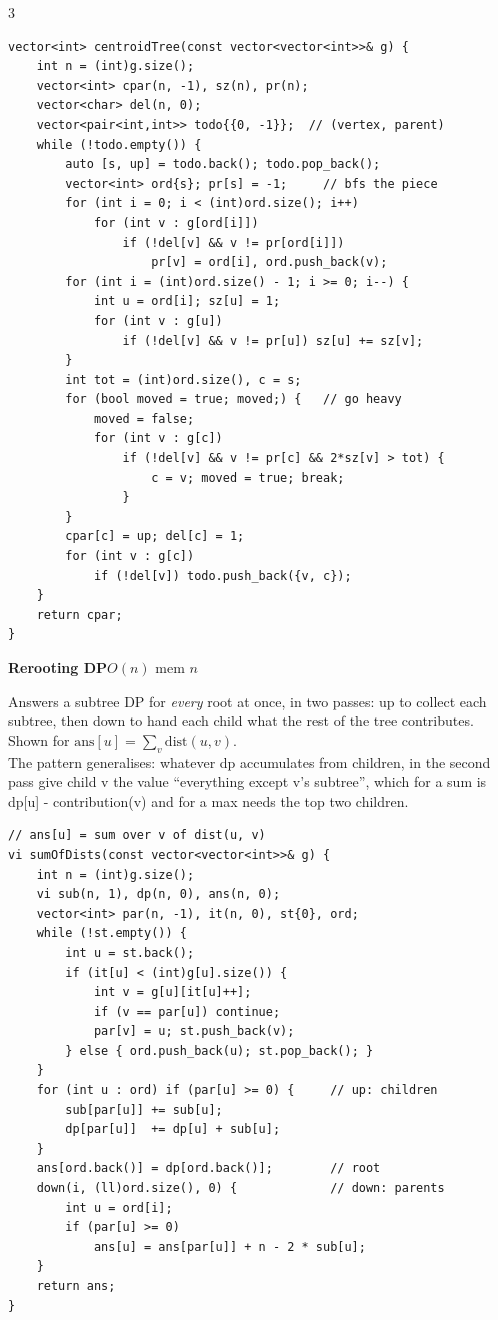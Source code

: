 \documentclass[9pt,a4paper]{extarticle}
\newcommand{\entry}[3]{%
  \addcontentsline{toc}{subsection}{#1}%
  \vspace{0.8ex}%
  \noindent\colorbox{hdbg}{\parbox{\dimexpr\columnwidth-2\fboxsep}{%
    \strut\textbf{#1}\hfill{\footnotesize\textsf{#2}}}}\par
  \vspace{0.4ex}%
  {\footnotesize #3\par}%
}
\newcommand{\code}[1]{{\ttfamily\small #1}}
\begin{document}
\begin{multicols*}{3}
\begin{lstlisting}
vector<int> centroidTree(const vector<vector<int>>& g) {
    int n = (int)g.size();
    vector<int> cpar(n, -1), sz(n), pr(n);
    vector<char> del(n, 0);
    vector<pair<int,int>> todo{{0, -1}};  // (vertex, parent)
    while (!todo.empty()) {
        auto [s, up] = todo.back(); todo.pop_back();
        vector<int> ord{s}; pr[s] = -1;     // bfs the piece
        for (int i = 0; i < (int)ord.size(); i++)
            for (int v : g[ord[i]])
                if (!del[v] && v != pr[ord[i]])
                    pr[v] = ord[i], ord.push_back(v);
        for (int i = (int)ord.size() - 1; i >= 0; i--) {
            int u = ord[i]; sz[u] = 1;
            for (int v : g[u])
                if (!del[v] && v != pr[u]) sz[u] += sz[v];
        }
        int tot = (int)ord.size(), c = s;
        for (bool moved = true; moved;) {   // go heavy
            moved = false;
            for (int v : g[c])
                if (!del[v] && v != pr[c] && 2*sz[v] > tot) {
                    c = v; moved = true; break;
                }
        }
        cpar[c] = up; del[c] = 1;
        for (int v : g[c])
            if (!del[v]) todo.push_back({v, c});
    }
    return cpar;
}
\end{lstlisting}

\entry{Rerooting DP}{$O(n)$ \quad mem $n$}{%
Answers a subtree DP for \emph{every} root at once, in two passes: up to collect each
subtree, then down to hand each child what the rest of the tree contributes. Shown for
$\mathrm{ans}[u] = \sum_v \mathrm{dist}(u,v)$.\\[0.3ex]
The pattern generalises: whatever \code{dp} accumulates from children, in the second
pass give child \code{v} the value ``everything except \code{v}'s subtree'', which for
a sum is \code{dp[u] - contribution(v)} and for a max needs the top two children.}

\begin{lstlisting}
// ans[u] = sum over v of dist(u, v)
vi sumOfDists(const vector<vector<int>>& g) {
    int n = (int)g.size();
    vi sub(n, 1), dp(n, 0), ans(n, 0);
    vector<int> par(n, -1), it(n, 0), st{0}, ord;
    while (!st.empty()) {
        int u = st.back();
        if (it[u] < (int)g[u].size()) {
            int v = g[u][it[u]++];
            if (v == par[u]) continue;
            par[v] = u; st.push_back(v);
        } else { ord.push_back(u); st.pop_back(); }
    }
    for (int u : ord) if (par[u] >= 0) {     // up: children
        sub[par[u]] += sub[u];
        dp[par[u]]  += dp[u] + sub[u];
    }
    ans[ord.back()] = dp[ord.back()];        // root
    down(i, (ll)ord.size(), 0) {             // down: parents
        int u = ord[i];
        if (par[u] >= 0)
            ans[u] = ans[par[u]] + n - 2 * sub[u];
    }
    return ans;
}
\end{lstlisting}


\end{multicols*}
\end{document}

